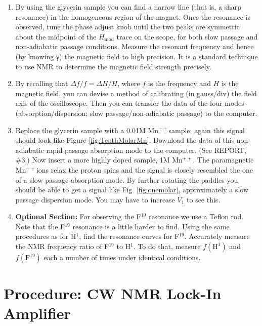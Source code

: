 \documentclass{../lab}
\begin{document}
\begin{enumerate}
    \item By using the glycerin sample you can find a narrow line (that is, a sharp resonance) in the homogeneous region of the magnet. Once the resonance is observed, tune the phase adjust knob until the two peaks are symmetric about the midpoint of the $H_\text{mod}$ trace on the scope, for both slow passage and non-adiabatic passage conditions. Measure the resonant frequency and hence (by knowing γ) the magnetic field to high precision. It is a standard technique to use NMR to determine the magnetic field strength precisely.

    \item By recalling that $\Delta f / f = \Delta H / H$, where $f$ is the frequency and $H$ is the magnetic field, you can devise a method of calibrating (in gauss/div) the field axis of the oscilloscope. Then you can transfer the data of the four modes (absorption/dispersion; slow passage/non-adiabatic passage) to the computer.

    
    \item Replace the glycerin sample with a 0.01M Mn$^{++}$sample; again this signal should look like Figure \ref{fig:TenthMolarMn}. Download the data of this non-adiabatic rapid-passage absorption mode to the computer. (See REPORT, \#3.) Now insert a more highly doped sample, 1M Mn$^{++}$. The paramagnetic Mn$^{++}$ions relax the proton spins and the signal is closely resembled the one of a slow passage absorption mode. By further rotating the paddles you should be able to get a signal like Fig. \ref{fig:onemolar}, approximately a slow passage dispersion mode. You may have to increase $V_1$ to see this.
    
    \item \textbf{Optional Section: } For observing the F$^{19}$ resonance we use a Teflon rod. Note that the F$^{19}$ resonance is a little harder to find. Using the same procedures as for H$^1$, find the resonance curves for F$^{19}$. Accurately measure the NMR frequency ratio of F$^{19}$ to H$^1$. To do that, measure $f(\text{H}^1)$ and $f(\text{F}^{19})$ each a number of times under identical conditions.
\end{enumerate}

\section{Procedure: CW NMR Lock-In Amplifier}
\end{document}
